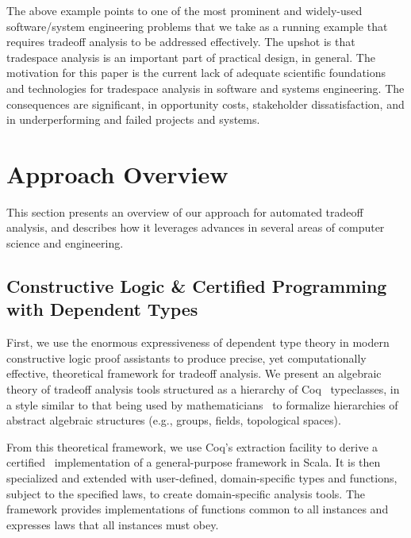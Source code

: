 \documentclass{sig-alternate}
\begin{document}
The above example points to one of the most prominent and widely-used software/system engineering problems that we take as a running example that requires tradeoff analysis to be addressed effectively.
The upshot is that tradespace analysis is an important part of practical design, in general. The motivation for this paper is the current lack of adequate scientific foundations and technologies for tradespace analysis in software and systems engineering. The consequences are significant, in opportunity costs, stakeholder dissatisfaction, and in underperforming and failed projects and systems. %

\section{Approach Overview}
\label{approach}

This section presents an overview of our approach for automated tradeoff analysis, and describes how it leverages advances in several areas of computer science and engineering.


\subsection{Constructive Logic \& Certified Programming with Dependent Types}
First, we use the enormous expressiveness of dependent type theory in modern constructive logic proof assistants to produce %
precise, yet computationally effective, theoretical framework for tradeoff analysis. 
We present an algebraic theory of tradeoff analysis tools structured as a hierarchy of Coq~\cite{coq_book} typeclasses, in a style similar to that being used by mathematicians~\cite{spitters2011type, pelayo2014homotopy} to formalize hierarchies of abstract algebraic structures (e.g., groups, fields, topological spaces).

From this theoretical framework, we use Coq's extraction facility to derive a certified~\cite{chlipala2013certified} implementation of a general-purpose framework in Scala. It is then specialized and extended with user-defined, domain-specific types and functions, subject to the specified laws, to create domain-specific analysis tools. The framework provides implementations of functions common to all instances and expresses laws that all instances must obey.
\end{document}
